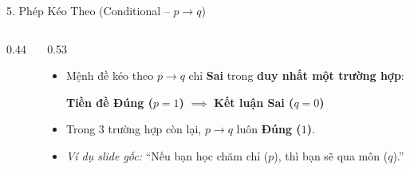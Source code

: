 \documentclass[aspectratio=169, 10pt]{beamer}
\begin{document}
\begin{frame}{5. Phép Kéo Theo (Conditional -- $p \to q$)}
\begin{columns}[t, onlytextwidth]
\begin{column}{0.44\textwidth}
\begin{cozyDef}
      \end{cozyDef}
    \end{column}
    \begin{column}{0.53\textwidth}
      \begin{cozyTrap}
        \small
        \begin{itemize}
          \setlength{\itemsep}{3pt}
          \item Mệnh đề kéo theo $p \to q$ chỉ \textbf{\textcolor{cozyFalse}{Sai}} trong \textbf{duy nhất một trường hợp}:\\
          \vspace{0.1cm}
          \centerline{\textbf{\textcolor{cozySlate}{Tiền đề Đúng ($p=1$)}} $\implies$ \textbf{\textcolor{cozyFalse}{Kết luận Sai ($q=0$)}}}
          \vspace{0.1cm}
          \item Trong 3 trường hợp còn lại, $p \to q$ luôn \textbf{\textcolor{cozyTrue}{Đúng ($1$)}}.
          \item \textit{Ví dụ slide gốc:} ``Nếu bạn học chăm chỉ ($p$), thì bạn sẽ qua môn ($q$).''
        \end{itemize}
      \end{cozyTrap}
    \end{column}
  \end{columns}
\end{frame}
\end{document}
